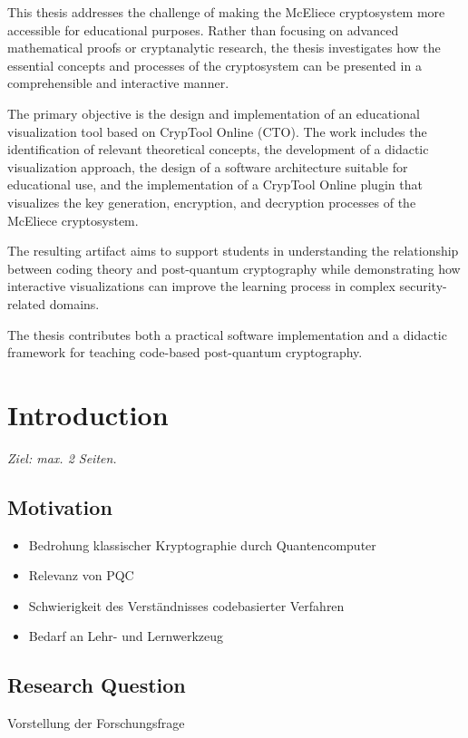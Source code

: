\documentclass[a4paper,11pt]{article}
\begin{document}
This thesis addresses the challenge of making the McEliece cryptosystem more
accessible for educational purposes. Rather than focusing on advanced mathematical
proofs or cryptanalytic research, the thesis investigates how the essential concepts
and processes of the cryptosystem can be presented in a comprehensible and
interactive manner.

The primary objective is the design and implementation of an educational
visualization tool based on CrypTool Online (CTO). The work includes the
identification of relevant theoretical concepts, the development of a didactic
visualization approach, the design of a software architecture suitable for
educational use, and the implementation of a CrypTool Online plugin that visualizes
the key generation, encryption, and decryption processes of the McEliece
cryptosystem.

The resulting artifact aims to support students in understanding the relationship
between coding theory and post-quantum cryptography while demonstrating how
interactive visualizations can improve the learning process in complex
security-related domains.

The thesis contributes both a practical software implementation and a didactic
framework for teaching code-based post-quantum cryptography.

\clearpage
\tableofcontents
\clearpage

\section{Introduction}
\textit{Ziel: max. 2 Seiten.}

\subsection{Motivation}
\begin{itemize}
	\item Bedrohung klassischer Kryptographie durch Quantencomputer
	\item Relevanz von PQC
	\item Schwierigkeit des Verständnisses codebasierter Verfahren
	\item Bedarf an Lehr- und Lernwerkzeug
\end{itemize}

\subsection{Research Question}
Vorstellung der Forschungsfrage
\end{document}
